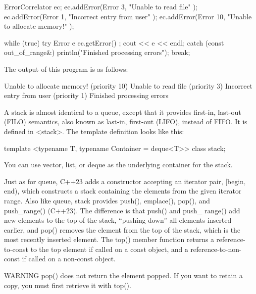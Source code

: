 \begin{cpp}
ErrorCorrelator ec;
ec.addError(Error { 3, "Unable to read file" });
ec.addError(Error { 1, "Incorrect entry from user" });
ec.addError(Error { 10, "Unable to allocate memory!" });

while (true) {
    try {
        Error e { ec.getError() };
        cout << e << endl;
    } catch (const out_of_range&) {
        println("Finished processing errors");
        break;
    }
}
\end{cpp}

The output of this program is as follows:

\begin{shell}
Unable to allocate memory! (priority 10)
Unable to read file (priority 3)
Incorrect entry from user (priority 1)
Finished processing errors
\end{shell}


A stack is almost identical to a queue, except that it provides first-in, last-out (FILO) semantics, also known as last-in, first-out (LIFO), instead of FIFO. It is defined in <stack>. The template definition looks like this:

\begin{cpp}
template <typename T, typename Container = deque<T>> class stack;
\end{cpp}

You can use vector, list, or deque as the underlying container for the stack.


Just as for queue, C++23 adds a constructor accepting an iterator pair, [begin, end), which constructs a stack containing the elements from the given iterator range. Also like queue, stack provides push(), emplace(), pop(), and push\_range() (C++23). The difference is that push() and push\_ range() add new elements to the top of the stack, “pushing down” all elements inserted earlier, and pop() removes the element from the top of the stack, which is the most recently inserted element. The top() member function returns a reference-to-const to the top element if called on a const object, and a reference-to-non-const if called on a non-const object.

\begin{myWarning}{WARNING}
pop() does not return the element popped. If you want to retain a copy, you must first retrieve it with top().
\end{myWarning}


